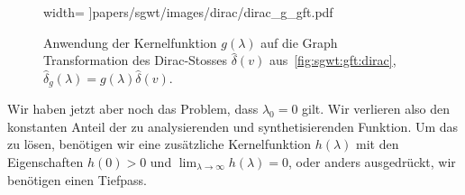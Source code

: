 \begin{figure}
\begin{minipage}[t]{0.49\textwidth}
        width=\textwidth
        ]{papers/sgwt/images/dirac/dirac_g_gft.pdf}
        \vspace{-20pt}
        \caption{Anwendung der Kernelfunktion $g(\lambda)$ auf die Graph 
            Transformation des Dirac-Stosses $\hat{\delta}(v)$ 
            aus~\cref{fig:sgwt:gft:dirac},
            $\hat{\delta}_g(\lambda) = g(\lambda)\hat{\delta}(v)$.
            \label{fig:sgwt:gft:ggft}}
    \end{minipage}
\end{figure}

Wir haben jetzt aber noch das Problem, dass $\lambda_0 = 0$ gilt. Wir verlieren 
also den konstanten Anteil der zu analysierenden und synthetisierenden 
Funktion. Um das zu l\"osen, ben\"otigen wir eine zus\"atzliche 
Kernelfunktion $h(\lambda)$ mit den Eigenschaften $h(0) > 0$ und 
$\lim_{\lambda\to\infty} h(\lambda) = 0$, oder anders ausgedr\"uckt, wir 
ben\"otigen einen Tiefpass.

